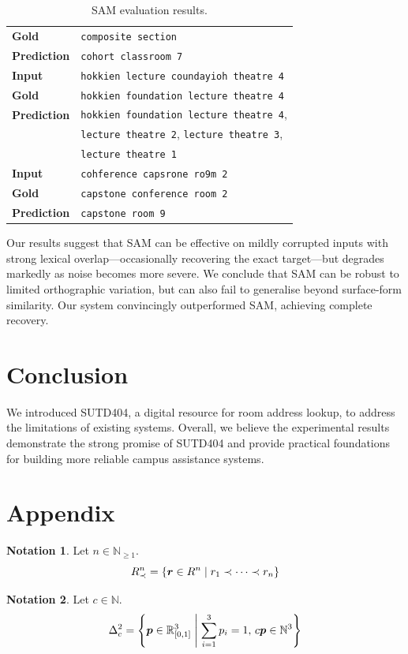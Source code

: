 \documentclass{article}
\theoremstyle{definition}
\newtheorem{notation}{Notation}
\newcommand{\N}{\mathbb{N}}
\newcommand{\R}{\mathbb{R}}
\begin{document}
\begin{table}[H]
\begin{tabularx}{\linewidth}{lX}
		\textbf{Gold} & \texttt{composite section} \\
		\textbf{Prediction} & \texttt{cohort classroom 7} \\
		\midrule
		\textbf{Input} & \texttt{hokkien lecture coundayioh theatre 4} \\
		\textbf{Gold} & \texttt{hokkien foundation lecture theatre 4} \\
		\textbf{Prediction} & \texttt{hokkien foundation lecture theatre 4}, \\
		& \texttt{lecture theatre 2}, \texttt{lecture theatre 3}, \\
		& \texttt{lecture theatre 1} \\
		\midrule
		\textbf{Input} & \texttt{cohference capsrone ro9m 2} \\
		\textbf{Gold} & \texttt{capstone conference room 2} \\
		\textbf{Prediction} & \texttt{capstone room 9} \\
		\bottomrule
	\end{tabularx}
	\caption{SAM evaluation results.}
\end{table}

\newpage

Our results suggest that SAM can be effective on mildly corrupted inputs with strong lexical overlap---occasionally recovering the exact target---but degrades markedly as noise becomes more severe.
We conclude that SAM can be robust to limited orthographic variation,
but can also fail to generalise beyond surface-form similarity.
Our system convincingly outperformed SAM, achieving complete recovery.

\section{Conclusion}

We introduced SUTD404,
a digital resource for room address lookup,
to address the limitations of existing systems.
Overall, we believe the experimental results demonstrate the strong promise of SUTD404
and provide practical foundations for building more reliable campus assistance systems.

\section{Appendix}

\begin{notation}
Let $n\in\N_{\geq 1}$.
$$
	R_{\prec}^{n}
	=
	\mleft\{
		\bm{r}\in R^{n}
		\;\middle|\;
		r_{1}\prec\dots\prec r_{n}
	\mright\}
$$
\end{notation}

\begin{notation}
Let $c\in\N$.
$$
	\Delta_{c}^{2}
	=
	\mleft\{
		\bm{p}\in\R_{[0,1]}^{3}
		\;\middle|\;
		\sum_{i=1}^{3}
		p_{i}
		=
		1
		,\,
		c\bm{p}\in\N^{3}
	\mright\}
$$
\end{notation}



\end{document}
